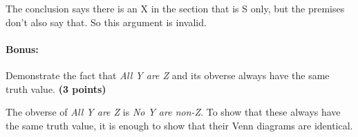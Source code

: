\documentclass[10pt]{article}
\begin{document}
\begin{enumerate}
\begin{multicols}{2}
\begin{center}
    The conclusion says there is an X in the section that is S only, but the premises don't also say that.  So this argument is invalid.
    \end{center}
    \end{multicols}
  
\end{enumerate}
  
\paragraph{Bonus:}  Demonstrate the fact that \textit{All Y are Z} and its obverse always have the same truth value. \textbf{(3 points)}

\vspace{.5cm}

The obverse of \textit{All Y are Z} is \textit{No Y are non-Z}.  To show that these always have the same truth value, it is enough to show that their Venn diagrams are identical.  

\begin{center}

\end{center}
\end{document}
